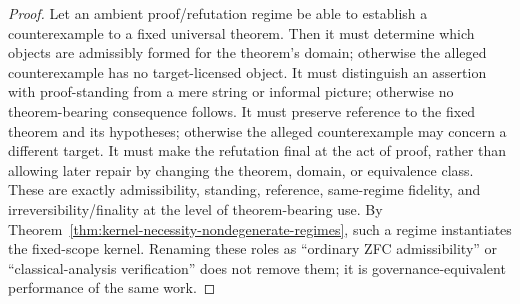 \begin{proof}
Let an ambient proof/refutation regime be able to establish a counterexample to a fixed universal theorem. Then it must determine which objects are admissibly formed for the theorem's domain; otherwise the alleged counterexample has no target-licensed object. It must distinguish an assertion with proof-standing from a mere string or informal picture; otherwise no theorem-bearing consequence follows. It must preserve reference to the fixed theorem and its hypotheses; otherwise the alleged counterexample may concern a different target. It must make the refutation final at the act of proof, rather than allowing later repair by changing the theorem, domain, or equivalence class. These are exactly admissibility, standing, reference, same-regime fidelity, and irreversibility/finality at the level of theorem-bearing use. By Theorem~\ref{thm:kernel-necessity-nondegenerate-regimes}, such a regime instantiates the fixed-scope kernel. Renaming these roles as ``ordinary ZFC admissibility'' or ``classical-analysis verification'' does not remove them; it is governance-equivalent performance of the same work.
\end{proof}


